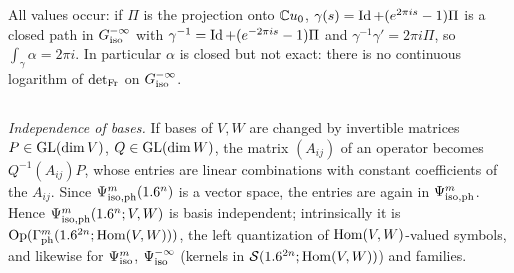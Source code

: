 All values occur: if $\Pi$ is the projection onto $\mathbb{C} u_0$, $\gamma(s)=\operatorname{Id}+(e^{2\pi is}-1)\Pi$ is a closed
path in $G^{-\infty}_{\mathrm{iso}}$ with $\gamma^{-1}=\operatorname{Id}+(e^{-2\pi is}-1)\Pi$ and $\gamma^{-1}\gamma'=2\pi i\Pi$, so
$\int_\gamma\alpha=2\pi i$. In particular $\alpha$ is closed but not exact: there is no continuous
logarithm of $\operatorname{det}_{\mathrm{Fr}}$ on $G^{-\infty}_{\mathrm{iso}}$.

\subsection*{}
\emph{Independence of bases.} If bases of $V,W$ are changed by invertible matrices $P\in\operatorname{GL}(\dim V)$,
$Q\in\operatorname{GL}(\dim W)$, the matrix $(A_{ij})$ of an operator becomes $Q^{-1}(A_{ij})P$, whose entries are
linear combinations with constant coefficients of the $A_{ij}$. Since $\Psi^{m}_{\mathrm{iso,ph}}(1.6^n)$ is a vector
space, the entries are again in $\Psi^{m}_{\mathrm{iso,ph}}$. Hence $\Psi^{m}_{\mathrm{iso,ph}}(1.6^n;V,W)$ is basis independent;
intrinsically it is $\operatorname{Op}(\Gamma^{m}_{\mathrm{ph}}(1.6^{2n};\operatorname{Hom}(V,W)))$, the left quantization of $\operatorname{Hom}(V,W)$-valued
symbols, and likewise for $\Psi^{m}_{\mathrm{iso}}$, $\Psi^{-\infty}_{\mathrm{iso}}$ (kernels in $\mathcal{S}(1.6^{2n};\operatorname{Hom}(V,W))$) and
families.

